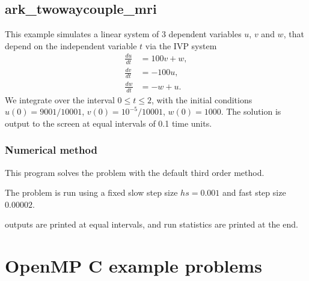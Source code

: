 \documentclass[letterpaper,10pt,english]{sphinxmanual}
\begin{document}
\section{ark\_twowaycouple\_mri}
\label{\detokenize{c_serial:ark-twowaycouple-mri}}\label{\detokenize{c_serial:id36}}
\sphinxAtStartPar
This example simulates a linear system of 3 dependent variables \(u\),
\(v\) and \(w\), that depend on the independent variable \(t\) via
the IVP system
\begin{equation*}
\begin{split}\frac{du}{dt} &= 100 v + w, \\
\frac{dv}{dt} &= -100 u, \\
\frac{dw}{dt} &= -w + u.\end{split}
\end{equation*}
\sphinxAtStartPar
We integrate over the interval \(0 \le t \le 2\), with the initial
conditions \(u(0) = 9001/10001\), \(v(0) = 10^{-5}/10001\),
\(w(0)= 1000\).  The solution is output to the screen at equal intervals of
0.1 time units.


\subsection{Numerical method}
\label{\detokenize{c_serial:id37}}
\sphinxAtStartPar
This program solves the problem with the default third order method.

\sphinxAtStartPar
The problem is run using a fixed slow step size \(hs=0.001\) and fast step
size \(0.00002\).

 outputs are printed at equal intervals, and run statistics
are printed at the end.

\sphinxstepscope


\chapter{OpenMP C example problems}
\label{\detokenize{c_openmp:openmp-c-example-problems}}\label{\detokenize{c_openmp:openmp-c}}\label{\detokenize{c_openmp::doc}}
\end{document}
